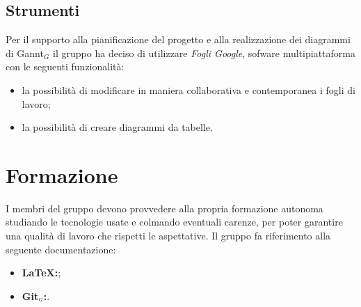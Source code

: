 \subsection{Strumenti}\label{ProcessiOrganizzativiProcessoDiPianificazioneStrumenti}
Per il supporto alla pianificazione del progetto e alla realizzazione dei diagrammi di Gannt$_G$ il gruppo ha deciso di utilizzare \textit{Fogli Google}, sofware multipiattaforma con le seguenti funzionalità:
\begin{itemize}
	\item la possibilità di modificare in maniera collaborativa e contemporanea i fogli di lavoro;
	\item la possibilità di creare diagrammi da tabelle.
\end{itemize}
\section{Formazione}\label{ProcessiOrganizzativiFormazione}
I membri del gruppo devono provvedere alla propria formazione autonoma studiando le tecnologie usate e colmando eventuali carenze, per poter garantire una qualità di lavoro che rispetti le aspettative. Il gruppo fa riferimento alla seguente documentazione:
\begin{itemize}
	\item \textbf{\LaTeX:};
	\item \textbf{Git$_{\scaleto{G}{3pt}}$:}.
\end{itemize}